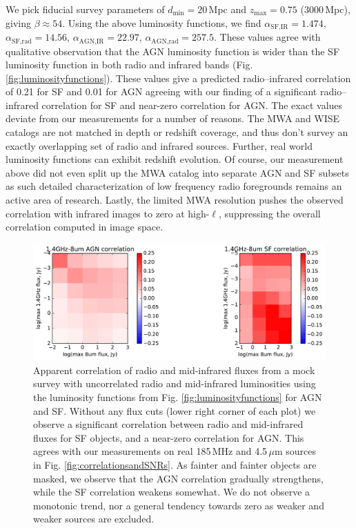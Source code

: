 \documentclass{emulateapj}
\newcommand{\mintext}{\text{min}}
\newcommand{\maxtext}{\text{max}}
\begin{document}
We pick fiducial survey parameters of $d_\mintext=20$\,Mpc and $z_\maxtext=0.75$ (3000\,Mpc), giving $\beta\approx54$.  Using the above luminosity functions, we find $\alpha_{\text{SF,IR}}=1.474$, $\alpha_{\text{SF,rad}}=14.56$, $\alpha_{\text{AGN,IR}}=22.97$, $\alpha_{\text{AGN,rad}}=257.5$. These values agree with qualitative observation that the AGN luminosity function is wider than the SF luminosity function in both radio and infrared bands (Fig. \ref{fig:luminosityfunctions}). These values give a predicted radio--infrared correlation of 0.21 for SF and 0.01 for AGN agreeing with our finding of a significant radio--infrared correlation for SF and near-zero correlation for AGN. The exact values deviate from our measurements for a number of reasons. The MWA and WISE catalogs are not matched in depth or redshift coverage, and thus don't survey an exactly overlapping set of radio and infrared sources. Further, real world luminosity functions can exhibit redshift evolution. Of course, our measurement above did not even split up the MWA catalog into separate AGN and SF subsets as such detailed characterization of low frequency radio foregrounds remains an active area of research. Lastly, the limited MWA resolution pushes the observed correlation with infrared images to zero at high-$\ell$, suppressing the overall correlation computed in image space.

\begin{figure}[h]
\centering
\includegraphics[width=6in]{images/sim_correlation_agn_and_sf.pdf}
\caption{Apparent correlation of radio and mid-infrared fluxes from a mock survey with uncorrelated radio and mid-infrared luminosities using the luminosity functions from Fig. \ref{fig:luminosityfunctions} for AGN and SF. Without any flux cuts (lower right corner of each plot) we observe a significant correlation between radio and mid-infrared fluxes for SF objects, and a near-zero correlation for AGN. This agrees with our measurements on real 185\,MHz and 4.5\,$\mu$m sources in Fig. \ref{fig:correlationsandSNRs}. As fainter and fainter objects are masked, we observe that the AGN correlation gradually strengthens, while the SF correlation weakens somewhat. We do not observe a monotonic trend, nor a general tendency towards zero as weaker and weaker sources are excluded. }
\label{fig:simagnlfcorrelations}
\end{figure}
\end{document}
